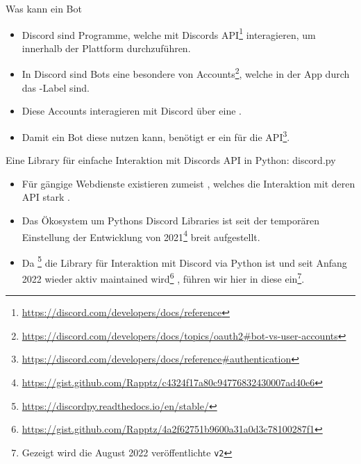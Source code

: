 \documentclass[12pt, aspectratio=169, usepdftitle=false]{beamer}
\newcommand{\pp}[1]{\lpl{#1}}
\newcommand{\furl}[1]{\footnote{\url{#1}}}
\begin{document}
\begin{frame}{Was kann ein Bot}
	\begin{itemize}
		\item Discord  sind Programme, welche mit Discords API\furl{https://discord.com/developers/docs/reference} interagieren, um  innerhalb der Plattform durchzuführen.
		
		\pause
		
		\item In Discord sind Bots eine besondere  von Accounts\furl{https://discord.com/developers/docs/topics/oauth2\#bot-vs-user-accounts}, welche in der App durch das \pp{BOT}-Label  sind.
		
		\pause
		
		\item Diese Accounts interagieren mit Discord über eine .
		
		\pause
		
		\item Damit ein Bot diese nutzen kann, benötigt er ein  für die API\furl{https://discord.com/developers/docs/reference\#authentication}.
	\end{itemize}
\end{frame}

\begin{frame}{Eine Library für einfache Interaktion mit Discords API in Python: discord.py}
	\begin{itemize}
		\item Für gängige Webdienste existieren zumeist , welches die Interaktion mit deren API stark .
		
		\pause
		
		\item Das Ökosystem um Pythons Discord Libraries ist seit der temporären Einstellung der Entwicklung von \pp{discord.py} 2021\furl{https://gist.github.com/Rapptz/c4324f17a80c94776832430007ad40e6} 
		breit aufgestellt.
		
		\pause
		
		\item Da \pp{discord.py}\furl{https://discordpy.readthedocs.io/en/stable/}
		 die  Library für Interaktion mit Discord via Python ist und seit Anfang 2022 wieder aktiv maintained wird\furl{https://gist.github.com/Rapptz/4a2f62751b9600a31a0d3c78100287f1}
		, führen wir hier in diese ein\footnote{Gezeigt wird die August 2022 veröffentlichte \texttt{v2}}.
	\end{itemize}
\end{frame}
\end{document}
